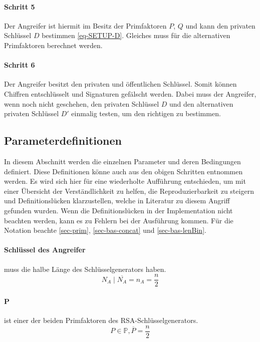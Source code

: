             \paragraph{Schritt 5} \label{sec-Schritt-Ang 5} Der Angreifer ist hiermit im Besitz der Primfaktoren $P$, $Q$ und kann den privaten Schlüssel $D$ bestimmen \eqref{eq-SETUP-D}. Gleiches muss für die alternativen Primfaktoren berechnet werden.

            \paragraph{Schritt 6} \label{sec-Schritt-Ang 6} Der Angreifer besitzt den privaten und öffentlichen Schlüssel. Somit können Chiffren entschlüsselt und Signaturen gefälscht werden. Dabei muss der Angreifer, wenn noch nicht geschehen, den privaten Schlüssel $D$ und den alternativen privaten Schlüssel $D'$ einmalig testen, um den richtigen zu bestimmen.
        
        \subsection{Parameterdefinitionen} \label{Parameterdefinitionen}
            In diesem Abschnitt werden die einzelnen Parameter und deren Bedingungen definiert. Diese Definitionen könne auch aus den obigen Schritten entnommen werden. Es wird sich hier für eine wiederholte Aufführung entschieden, um mit einer Übersicht der Verständlichkeit zu helfen, die Reproduzierbarkeit zu steigern und Definitionslücken klarzustellen, welche in Literatur zu diesem Angriff gefunden wurden. Wenn die Definitionslücken in der Implementation nicht beachten werden, kann es zu Fehlern bei der Ausführung kommen. Für die Notation beachte \ref{sec-prim}, \ref{sec-bas-concat} und \ref{sec-bas-lenBin}.

            \paragraph{Schlüssel des Angreifer} muss die halbe Länge des Schlüsselgenerators haben.
                \begin{equation}
                    N_{A} \mid \overline{N_{A}} = n_{A} = \frac{n}{2}
                \end{equation}

            \paragraph{P} ist einer der beiden Primfaktoren des \ac{RSA}-Schlüsselgenerators. 
                \begin{equation}
                    P \in \mathbb{P}, \overline{P} = \frac{n}{2}
                \end{equation}
            

